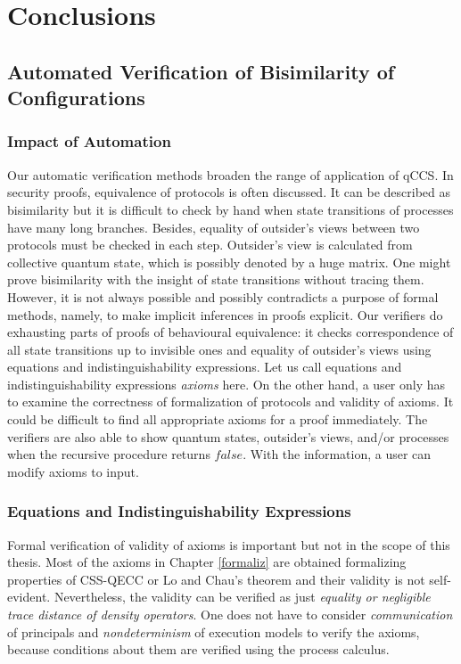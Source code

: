 \chapter{Conclusions}
\section{Automated Verification of Bisimilarity of Configurations}
\subsection*{Impact of Automation}
Our automatic verification methods
broaden the range of application of qCCS.
In security proofs, equivalence of protocols is often discussed.
It can be described as bisimilarity but it is
difficult to check by hand when state transitions of processes
have many long branches.
 Besides, equality of outsider's views
between two protocols must be checked in each step.
Outsider's view is calculated from collective quantum state,
which is possibly denoted by a huge matrix.
One might prove bisimilarity with the insight of state transitions
without tracing them. However, it is not always possible and
possibly contradicts a purpose of formal methods, namely,
to make implicit inferences in proofs explicit.
 Our verifiers do exhausting parts of proofs of
behavioural equivalence: it checks correspondence
of all state transitions up to invisible ones and 
equality of outsider's views using equations and 
indistinguishability expressions.
Let us call equations and indistinguishability expressions {\it axioms}
here.
On the other hand, a user only has to
examine the correctness of formalization of protocols and validity of
axioms.
It could be difficult to find all appropriate axioms for a proof
immediately. The verifiers are also able to show quantum states,
outsider's views, and/or
processes when the recursive procedure returns $\mathit{false}$. With
the information,
a user can modify axioms to input.

\subsection*{Equations and Indistinguishability Expressions}
\label{concl:validityof}
Formal verification of validity of axioms is important but
not in the scope of this thesis. Most of the axioms in Chapter 
\ref{formaliz} are obtained formalizing properties of CSS-QECC
\cite{CalderbankShor1996} or Lo and Chau's theorem \cite{LoChau1999}
and their validity is not self-evident.
Nevertheless, the validity can be verified as just {\it equality or
negligible trace distance of density operators}.
One does not have to consider {\it communication} of principals
and {\it nondeterminism}
of execution models to verify the axioms, because
conditions about them are verified using the process calculus.

